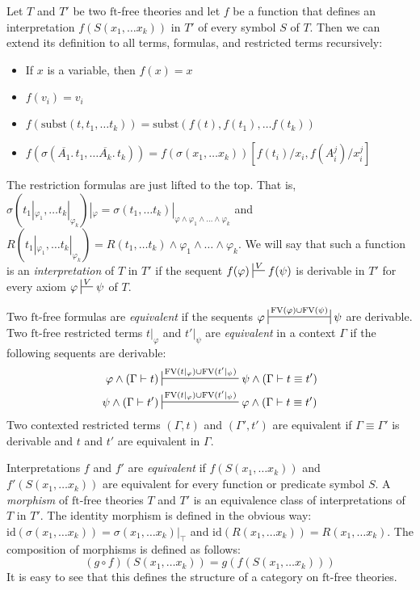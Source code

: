 \documentclass[reqno]{amsart}
\theoremstyle{definition}
\theoremstyle{remark}
\newcommand{\fs}[1]{\mathrm{#1}}
\newcommand{\FV}{\fs{FV}}
\newcommand{\subst}{\fs{subst}}
\newcommand{\ft}{\fs{ft}}
\newcommand{\id}{\fs{id}}
\numberwithin{figure}{section}
\begin{document}
Let $T$ and $T'$ be two $\ft$-free theories and let $f$ be a function that defines an interpretation $f(S(x_1, \ldots x_k))$ in $T'$ of every symbol $S$ of $T$.
Then we can extend its definition to all terms, formulas, and restricted terms recursively:
\begin{itemize}
\item If $x$ is a variable, then $f(x) = x$
\item $f(v_i) = v_i$
\item $f(\subst(t, t_1, \ldots t_k)) = \subst(f(t), f(t_1), \ldots f(t_k))$
\item $f(\sigma(\overline{A_1}.\,t_1, \ldots \overline{A_k}.\,t_k)) = f(\sigma(x_1, \ldots x_k))[f(t_i)/x_i, f(A_i^j)/x_i^j]$
\end{itemize}
The restriction formulas are just lifted to the top.
That is, $\sigma(t_1|_{\varphi_1}, \ldots t_k|_{\varphi_k})|_\varphi = \sigma(t_1, \ldots t_k)|_{\varphi \land \varphi_1 \land \ldots \land \varphi_k}$ and $R(t_1|_{\varphi_1}, \ldots t_k|_{\varphi_k}) = R(t_1, \ldots t_k) \land \varphi_1 \land \ldots \land \varphi_k$.
We will say that such a function is an \emph{interpretation} of $T$ in $T'$ if the sequent $f(\varphi) \sststile{}{V} f(\psi)$ is derivable in $T'$ for every axiom $\varphi \sststile{}{V} \psi$ of $T$.

Two $\ft$-free formulas are \emph{equivalent} if the sequents $\varphi \ssststile{}{\FV(\varphi) \cup \FV(\psi)} \psi$ are derivable.
Two $\ft$-free restricted terms $t|_\varphi$ and $t'|_\psi$ are \emph{equivalent} in a context $\Gamma$ if the following sequents are derivable:
\begin{align*}
\varphi \land (\Gamma \vdash t) & \sststile{}{\FV(t|_\varphi) \cup \FV(t'|_\psi)} \psi \land (\Gamma \vdash t \equiv t') \\
\psi \land (\Gamma \vdash t') & \sststile{}{\FV(t|_\varphi) \cup \FV(t'|_\psi)} \varphi \land (\Gamma \vdash t \equiv t')
\end{align*}
Two contexted restricted terms $(\Gamma,t)$ and $(\Gamma',t')$ are equivalent if $\Gamma \equiv \Gamma'$ is derivable and $t$ and $t'$ are equivalent in $\Gamma$.

Interpretations $f$ and $f'$ are \emph{equivalent} if $f(S(x_1, \ldots x_k))$ and $f'(S(x_1, \ldots x_k))$ are equivalent for every function or predicate symbol $S$.
A \emph{morphism} of $\ft$-free theories $T$ and $T'$ is an equivalence class of interpretations of $T$ in $T'$.
The identity morphism is defined in the obvious way: $\id(\sigma(x_1, \ldots x_k)) = \sigma(x_1, \ldots x_k)|_\top$ and $\id(R(x_1, \ldots x_k)) = R(x_1, \ldots x_k)$.
The composition of morphisms is defined as follows:
\[ (g \circ f)(S(x_1, \ldots x_k)) = g(f(S(x_1, \ldots x_k))) \]
It is easy to see that this defines the structure of a category on $\ft$-free theories.
\end{document}

